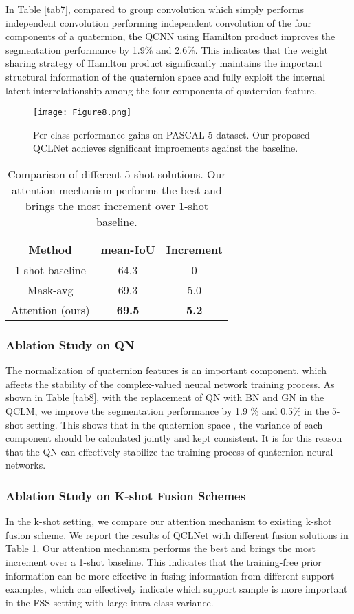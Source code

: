 \documentclass[lettersize,journal]{IEEEtran}
\begin{document}
In Table \ref{tab7}, compared to group convolution which simply performs independent convolution performing independent convolution of the four components of a quaternion, the QCNN using Hamilton product improves the segmentation performance by 1.9\% and 2.6\%. This indicates that the weight sharing strategy of Hamilton product significantly maintains the important structural information of the quaternion space and fully exploit the internal latent interrelationship among the four components of quaternion feature.

\begin{figure}[t]
\texttt{[image: Figure8.png]}
\caption{Per-class performance gains on PASCAL-5 dataset. Our proposed QCLNet achieves significant improements against the baseline.
\label{Figure8}}
\end{figure} 

\begin{table}
\centering
\caption{Comparison of different 5-shot solutions. Our attention mechanism performs the best and brings the most increment over 1-shot baseline. }
\label{tab9}
\begin{tabular}{c|cc} 
\hline
Method           & mean-IoU & Increment  \\ 
\hline
1-shot baseline  & 64.3     & 0          \\ 
\hline
Mask-avg         & 69.3     & 5.0        \\
Attention (ours) &\textbf{69.5}    &\textbf{5.2}        \\
\hline
\end{tabular}
\end{table}

\subsubsection{Ablation Study on QN}
The normalization of quaternion features is an important component, which affects the stability of the complex-valued neural network training process. As shown in Table \ref{tab8}, with the replacement of QN with BN and GN in the QCLM, we improve the segmentation performance by 1.9 \% and 0.5\% in the 5-shot setting. This shows that in the quaternion space , the variance of each component should be calculated jointly and kept consistent. It is for this reason that the QN can effectively stabilize the training process of quaternion neural networks.


\subsubsection{Ablation Study on K-shot Fusion Schemes}
In the k-shot setting, we compare our attention mechanism to existing k-shot fusion scheme. We report the results of QCLNet with different fusion solutions in Table \ref{tab9}. Our attention mechanism performs the best and brings the most increment over a 1-shot baseline. This indicates that the training-free prior information can be more effective in fusing information from different support examples, which can effectively indicate which support sample is more important in the FSS setting with large intra-class variance.
\end{document}
